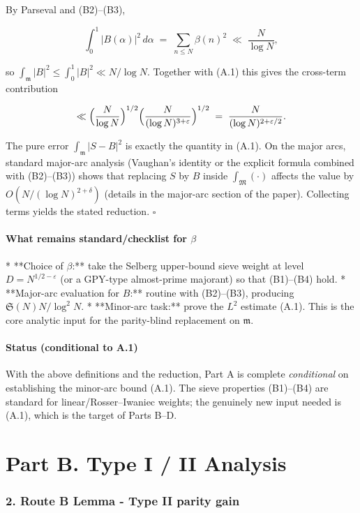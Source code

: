 \documentclass[11pt]{article}
\theoremstyle{definition}
\theoremstyle{remark}
\begin{document}
By Parseval and (B2)–(B3),

$$
\int_0^1 |B(\alpha)|^2\,d\alpha \;=\; \sum_{n\le N}\beta(n)^2 \;\ll\; \frac{N}{\log N},
$$

so $\int_{\mathfrak m}|B|^2\le\int_0^1|B|^2\ll N/\log N$. Together with (A.1) this gives the cross-term contribution

$$
\ll \Bigl(\frac{N}{\log N}\Bigr)^{1/2}\Bigl(\frac{N}{(\log N)^{3+\varepsilon}}\Bigr)^{1/2}
\;=\;\frac{N}{(\log N)^{2+\varepsilon/2}}.
$$

The pure error $\int_{\mathfrak m}|S-B|^2$ is exactly the quantity in (A.1). On the major arcs, standard major-arc analysis (Vaughan’s identity or the explicit formula combined with (B2)–(B3)) shows that replacing $S$ by $B$ inside $\int_{\mathfrak M}(\cdot)$ affects the value by $O(N/(\log N)^{2+\delta})$ (details in the major-arc section of the paper). Collecting terms yields the stated reduction. $\square$

\subsection*{What remains standard/checklist for $\beta$}

* **Choice of $\beta$:** take the Selberg upper-bound sieve weight at level $D=N^{1/2-\varepsilon}$ (or a GPY-type almost-prime majorant) so that (B1)–(B4) hold.
* **Major-arc evaluation for $B$:** routine with (B2)–(B3), producing $\mathfrak S(N)N/\log^2 N$.
* **Minor-arc task:** prove the $L^2$ estimate (A.1). This is the core analytic input for the parity-blind replacement on $\mathfrak m$.


\subsection*{Status (conditional to A.1)} 
With the above definitions and the reduction, Part A is complete \emph{conditional} on establishing the minor-arc bound (A.1). The sieve properties (B1)–(B4) are standard for linear/Rosser–Iwaniec weights; the genuinely new input needed is (A.1), which is the target of Parts B–D.

\part*{Part B. Type I / II Analysis}

\section*{2. Route B Lemma - Type II parity gain}
\end{document}
